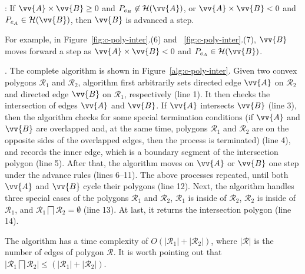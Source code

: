 : If $\vv{A} \times \vv{B} \ge 0$ and $P_{e_B} \not \in \mathcal{H}(\vv{A})$, or $\vv{A} \times \vv{B} < 0$ and $P_{e_A} \in \mathcal{H}(\vv{B})$, then  $\vv{B}$ is advanced a step.


For example, in Figure~\ref{fig:c-poly-inter}.(6) and ~\ref{fig:c-poly-inter}.(7), $\vv{B}$ moves forward a step as $\vv{A} \times \vv{B} < 0$ and $P_{e_A} \in \mathcal{H}(\vv{B})$.


. The complete algorithm is shown in Figure~\ref{alg:c-poly-inter}.
Given two convex polygons $\mathcal{R}_1$ and $\mathcal{R}_2$, algorithm \cpia first arbitrarily sets directed edge $\vv{A}$ on $\mathcal{R}_2$ and directed edge $\vv{B}$ on $\mathcal{R}_1$, respectively (line 1).
%
It then checks the intersection of edges $\vv{A}$ and $\vv{B}$. If $\vv{A}$ intersects $\vv{B}$ (line 3), then the algorithm checks for some special termination conditions (\eg if $\vv{A}$ and $\vv{B}$ are overlapped and, at the same time, polygons $\mathcal{R}_1$ and $\mathcal{R}_2$ are on the opposite sides of the overlapped edges, then the process is terminated) (line 4), and records the inner edge, which is a boundary segment of the intersection polygon (line 5).
After that, the algorithm moves on $\vv{A}$ or $\vv{B}$ one step under the advance rules (lines 6--11).
The above processes repeated, until both $\vv{A}$ and $\vv{B}$ cycle their polygons (line 12).
%
Next, the algorithm handles three special cases of the polygons $\mathcal{R}_1$ and $\mathcal{R}_2$, \ie $\mathcal{R}_1$ is inside of $\mathcal{R}_2$, $\mathcal{R}_2$ is inside of $\mathcal{R}_1$, and $\mathcal{R}_1 \bigsqcap \mathcal{R}_2 = \emptyset$ (line 13).
%
At last, it returns the intersection polygon (line 14).


The algorithm has a time complexity of $O(|\mathcal{R}_1| + |\mathcal{R}_2|)$, where $|\mathcal{R}|$ is the number of edges of polygon $\mathcal{R}$.
It is worth pointing out that $|\mathcal{R}_1 \bigsqcap \mathcal{R}_2| \le (|\mathcal{R}_1| + |\mathcal{R}_2|)$.


